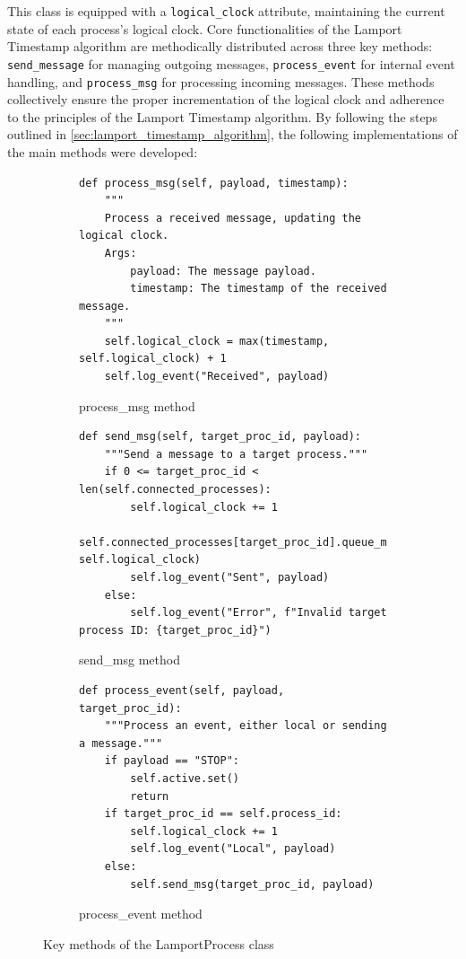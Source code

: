 \documentclass{article}
\begin{document}
      
      This class is equipped with a \texttt{logical\_clock} attribute, maintaining the current state of each process's logical clock. Core functionalities of the Lamport Timestamp algorithm are methodically distributed across three key methods: \texttt{send\_message} for managing outgoing messages, \texttt{process\_event} for internal event handling, and \texttt{process\_msg} for processing incoming messages. These methods collectively ensure the proper incrementation of the logical clock and adherence to the principles of the Lamport Timestamp algorithm. By following the steps outlined in \ref*{sec:lamport_timestamp_algorithm}, the following implementations of the main methods were developed:
      \begin{figure}[h!]
        \centering
        \begin{subfigure}{0.51\textwidth}
        \begin{verbatim}
def process_msg(self, payload, timestamp):
    """
    Process a received message, updating the logical clock.
    Args:
        payload: The message payload.
        timestamp: The timestamp of the received message.
    """
    self.logical_clock = max(timestamp, self.logical_clock) + 1
    self.log_event("Received", payload)
        \end{verbatim}
        \caption{process\_msg method}
        \label{fig:process_msg}
    \end{subfigure}
    \hfill
    \begin{subfigure}{0.51\textwidth}
        \begin{verbatim}
def send_msg(self, target_proc_id, payload):
    """Send a message to a target process."""
    if 0 <= target_proc_id < len(self.connected_processes):
        self.logical_clock += 1
        self.connected_processes[target_proc_id].queue_msg(payload, self.logical_clock)
        self.log_event("Sent", payload)
    else:
        self.log_event("Error", f"Invalid target process ID: {target_proc_id}")
        \end{verbatim}
        \caption{send\_msg method}
        \label{fig:send_msg}
    \end{subfigure}
    \par\bigskip %
    \begin{subfigure}{0.51\textwidth}
        \begin{verbatim}
def process_event(self, payload, target_proc_id):
    """Process an event, either local or sending a message."""
    if payload == "STOP":
        self.active.set()
        return
    if target_proc_id == self.process_id:
        self.logical_clock += 1
        self.log_event("Local", payload)
    else:
        self.send_msg(target_proc_id, payload)
        \end{verbatim}
        \caption{process\_event method}
        \label{fig:process_event}
    \end{subfigure}
    \caption{Key methods of the LamportProcess class}
    \label{fig:lamport_process_methods}
    \end{figure}
      
\end{document}
